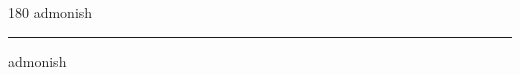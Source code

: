
\begin{frame}
\begin{center}
\begin{turn}{180}
{\fontsize{2.5cm}{1em}\selectfont admonish}
\end{turn}
\vspace{1em}\par  
\hrule
\vspace{1em}\par  
{\fontsize{2.5cm}{1em}\selectfont admonish}
\end{center}
\end{frame}
